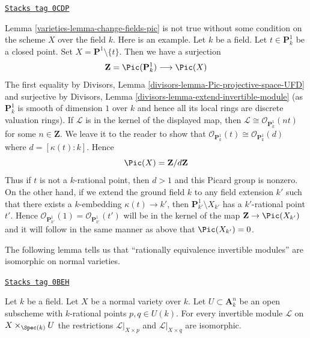 \begin{example}
\label{varieties-example-need-condition}
\href{https://stacks.math.columbia.edu/tag/0CDP}{\texttt{Stacks tag 0CDP}}

Lemma \ref{varieties-lemma-change-fields-pic} is not true without some condition
on the scheme $X$ over the field $k$. Here is an example.
Let $k$ be a field. Let $t \in \mathbf{P}^1_k$ be a closed point.
Set $X = \mathbf{P}^1 \setminus \{t\}$. Then we have a surjection
$$
\mathbf{Z} = \Pic(\mathbf{P}^1_k) \longrightarrow \Pic(X)
$$
The first equality by
Divisors, Lemma \ref{divisors-lemma-Pic-projective-space-UFD}
and surjective by
Divisors, Lemma \ref{divisors-lemma-extend-invertible-module}
(as $\mathbf{P}^1_k$ is smooth of dimension $1$ over $k$ and
hence all its local rings are discrete valuation rings).
If $\mathcal{L}$ is in the kernel of the displayed map,
then $\mathcal{L} \cong \mathcal{O}_{\mathbf{P}^1_k}(nt)$
for some $n \in \mathbf{Z}$. We leave it to the reader
to show that
$\mathcal{O}_{\mathbf{P}^1_k}(t) \cong \mathcal{O}_{\mathbf{P}^1_k}(d)$
where $d = [\kappa(t) : k]$. Hence
$$
\Pic(X) = \mathbf{Z}/d\mathbf{Z}
$$
Thus if $t$ is not a $k$-rational point, then $d > 1$ and this
Picard group is nonzero.
On the other hand, if we extend the ground field $k$ to any field
extension $k'$ such that there exists a $k$-embedding
$\kappa(t) \to k'$, then $\mathbf{P}^1_{k'} \setminus X_{k'}$
has a $k'$-rational point $t'$. Hence
$\mathcal{O}_{\mathbf{P}^1_{k'}}(1) = \mathcal{O}_{\mathbf{P}^1_{k'}}(t')$
will be in the kernel of the map $\mathbf{Z} \to \Pic(X_{k'})$
and it will follow in the same manner as above that
$\Pic(X_{k'}) = 0$.
\end{example}

The following lemma tells us that ``rationally
equivalence invertible modules'' are isomorphic on normal varieties.

\begin{lemma}
\label{varieties-lemma-rational-equivalence-for-Pic}
\href{https://stacks.math.columbia.edu/tag/0BEH}{\texttt{Stacks tag 0BEH}}

Let $k$ be a field. Let $X$ be a normal variety over $k$.
Let $U \subset \mathbf{A}^n_k$ be an open subscheme with
$k$-rational points $p, q \in U(k)$. For every invertible
module $\mathcal{L}$ on $X \times_{\Spec(k)} U$ the restrictions
$\mathcal{L}|_{X \times p}$ and $\mathcal{L}|_{X \times q}$
are isomorphic.
\end{lemma}

